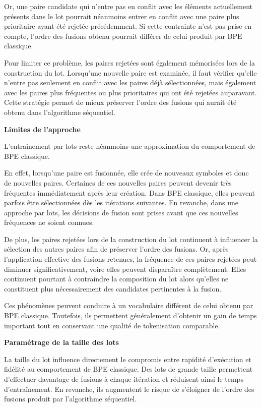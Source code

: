 \documentclass[12pt,a4paper]{report}
\begin{document}
	Or, une paire candidate qui n’entre pas en conflit avec les éléments actuellement présents dans le lot pourrait néanmoins entrer en conflit avec une paire plus prioritaire ayant été rejetée précédemment. Si cette contrainte n’est pas prise en compte, l’ordre des fusions obtenu pourrait différer de celui produit par BPE classique.
	
	Pour limiter ce problème, les paires rejetées sont également mémorisées lors de la construction du lot. Lorsqu’une nouvelle paire est examinée, il faut vérifier qu’elle n’entre pas seulement en conflit avec les paires déjà sélectionnées, mais également avec les paires plus fréquentes ou plus prioritaires qui ont été rejetées auparavant. Cette stratégie permet de mieux préserver l’ordre des fusions qui aurait été obtenu dans l’algorithme séquentiel.
	
	\textbf{Limites de l’approche}
	
	L’entraînement par lots reste néanmoins une approximation du comportement de BPE classique.
	
	En effet, lorsqu’une paire est fusionnée, elle crée de nouveaux symboles et donc de nouvelles paires. Certaines de ces nouvelles paires peuvent devenir très fréquentes immédiatement après leur création. Dans BPE classique, elles peuvent parfois être sélectionnées dès les itérations suivantes. En revanche, dans une approche par lots, les décisions de fusion sont prises avant que ces nouvelles fréquences ne soient connues.
	
	De plus, les paires rejetées lors de la construction du lot continuent à influencer la sélection des autres paires afin de préserver l’ordre des fusions. Or, après l’application effective des fusions retenues, la fréquence de ces paires rejetées peut diminuer significativement, voire elles peuvent disparaître complètement. Elles continuent pourtant à contraindre la composition du lot alors qu’elles ne constituent plus nécessairement des candidates pertinentes à la fusion.
	
	Ces phénomènes peuvent conduire à un vocabulaire différent de celui obtenu par BPE classique. Toutefois, ils permettent généralement d’obtenir un gain de temps important tout en conservant une qualité de tokenisation comparable.
	
	\textbf{Paramétrage de la taille des lots}
	
	La taille du lot influence directement le compromis entre rapidité d’exécution et fidélité au comportement de BPE classique. Des lots de grande taille permettent d’effectuer davantage de fusions à chaque itération et réduisent ainsi le temps d’entraînement. En revanche, ils augmentent le risque de s’éloigner de l’ordre des fusions produit par l’algorithme séquentiel.
	
\end{document}
